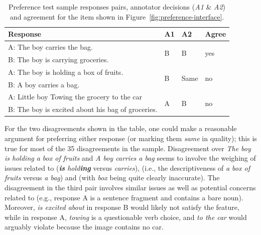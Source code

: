 \begin{table}[htb!]
\begin{center}
\begin{tabular}{|l|l|l|l|}
\hline
 Response & A1 & A2 & Agree \\
\hline
\hline
A: The boy carries the bag. & \multirow{2}{*}{B} & \multirow{2}{*}{B} & \multirow{2}{*}{yes} \\
\cline{1-1}
B: The boy is carrying groceries. & & & \\
\hline
\hline
A: The boy is holding a box of fruits. & \multirow{2}{*}{B} & \multirow{2}{*}{Same} & \multirow{2}{*}{no} \\
\cline{1-1}
B: A boy carries a bag. & & & \\
\hline
\hline
A: Little boy Towing the grocery to the car & \multirow{2}{*}{A} & \multirow{2}{*}{B} & \multirow{2}{*}{no} \\
\cline{1-1}
B: The boy is excited about his bag of groceries. & & & \\
\hline
\end{tabular}
\caption{\label{tab:preference-example-pairs} Preference test sample responses pairs, annotator decisions (\textit{A1} \& \textit{A2}) and agreement for the item shown in Figure~\ref{fig:preference-interface}.}
\end{center}
\end{table}

For the two disagreements shown in the table, one could make a reasonable argument for preferring either response (or marking them \textit{same} in quality); this is true for  most of the 35 disagreements in the sample. Disagreement over \textit{The boy is holding a box of fruits} and \textit{A boy carries a bag} seems to involve the weighing of issues related to  (\textit{\textbf{is} hold\textbf{ing}} versus \textit{carries}),  (i.e., the descriptiveness of \textit{a box of fruits} versus \textit{a bag}) and  (with \textit{box} being quite clearly inaccurate). The disagreement in the third pair involves similar  issues as well as potential concerns related to  (e.g., response A is a sentence fragment and contains a bare noun). Moreover, \textit{is excited about} in response B would likely not satisfy the  feature, while in response A, \textit{towing} is a questionable verb choice, and \textit{to the car} would arguably violate  because the image contains no car.

